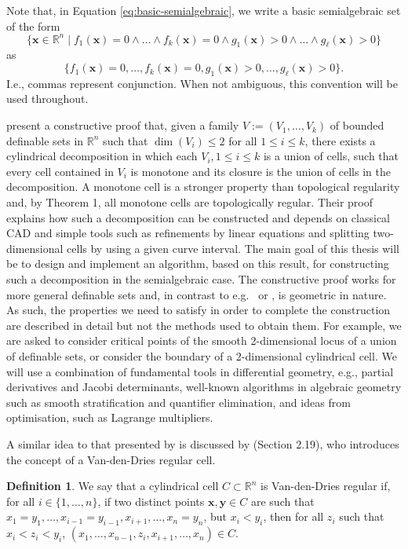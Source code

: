 \documentclass[
]{book}
\theoremstyle{definition}
\newtheorem{definition}{Definition}[chapter]
\theoremstyle{definition}
\theoremstyle{definition}
\theoremstyle{definition}
\theoremstyle{remark}
\begin{document}
Note that, in Equation \eqref{eq:basic-semialgebraic}, we write a basic semialgebraic set of the form
\[
\{ \mathbf{x} \in \mathbb{R}^n \mid f_1(\mathbf{x}) = 0 \land \ldots \land f_k(\mathbf{x}) = 0 \land g_1(\mathbf{x}) > 0 \land \ldots \land g_\ell(\mathbf{x}) > 0 \}
\]
as
\[
\{ f_1(\mathbf{x}) = 0, \ldots, f_k(\mathbf{x}) = 0, g_1(\mathbf{x}) > 0, \ldots, g_\ell(\mathbf{x}) > 0 \}.
\]
I.e., commas represent conjunction. When not ambiguous, this convention will be used throughout.

\citet{bgv15} present a constructive proof that, given a family \(V := (V_1,\ldots,V_k)\) of bounded definable sets in \(\mathbb{R}^n\) such that \(\dim(V_i) \le 2\) for all \(1 \le i \le k\), there exists a cylindrical decomposition in which each \(V_i, 1 \le i \le k\) is a union of cells, such that every cell contained in \(V_i\) is monotone and its closure is the union of cells in the decomposition. A monotone cell is a stronger property than topological regularity and, by \citet{bgv13} Theorem 1, all monotone cells are topologically regular. Their proof explains how such a decomposition can be constructed and depends on classical CAD and simple tools such as refinements by linear equations and splitting two-dimensional cells by using a given curve interval.
The main goal of this thesis will be to design and implement an algorithm, based on this result, for constructing such a decomposition in the semialgebraic case.
The constructive proof works for more general definable sets and, in contrast to e.g.~\citet{collins1975} or \citet{lazard10}, is geometric in nature. As such, the properties we need to satisfy in order to complete the construction are described in detail but not the methods used to obtain them. For example, we are asked to consider critical points of the smooth 2-dimensional locus of a union of definable sets, or consider the boundary of a 2-dimensional cylindrical cell.
We will use a combination of fundamental tools in differential geometry, e.g., partial derivatives and Jacobi determinants, well-known algorithms in algebraic geometry such as smooth stratification and quantifier elimination, and ideas from optimisation, such as Lagrange multipliers.

A similar idea to that presented by \citet{bgv15} is discussed by \citet{vdd98} (Section 2.19), who introduces the concept of a Van-den-Dries regular cell.

\begin{definition}
\citep[Section 2.19]{vdd98}
We say that a cylindrical cell \(C \subset \mathbb{R}^n\) is Van-den-Dries regular if, for all \(i \in \{1,\ldots,n\}\), if two distinct points \(\mathbf{x},\mathbf{y} \in C\) are such that \(x_1 = y_1, \ldots, x_{i-1} = y_{i-1}, x_{i+1}, \ldots, x_n = y_n\), but \(x_i < y_i\), then for all \(z_i\) such that \(x_i < z_i < y_i\), \((x_1,\ldots,x_{n-1},z_i,x_{i+1},\ldots,x_n) \in C\).
\end{definition}
\end{document}
